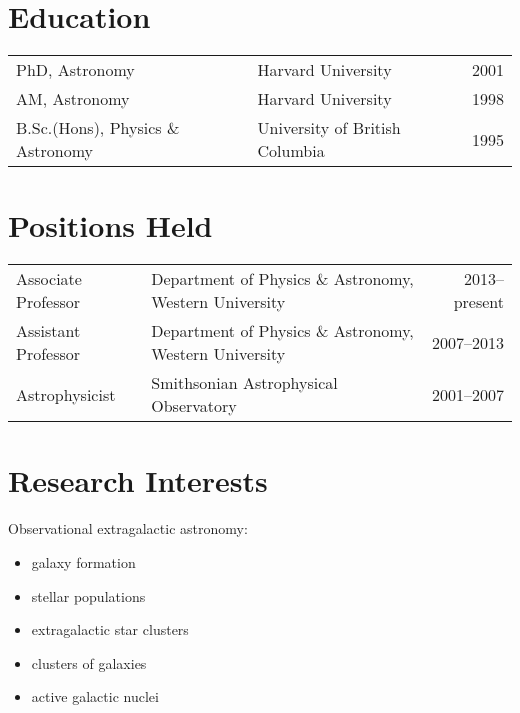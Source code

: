 \documentclass[12pt]{article}
\begin{document}
\maketitle

\section{Education}
\begin{tabularx}{\textwidth}{lXr}
PhD, Astronomy & Harvard University & 2001\\
AM, Astronomy & Harvard University & 1998\\
B.Sc.(Hons),  Physics \& Astronomy & University of British Columbia&1995\\
\end{tabularx}

\section{Positions Held} 

\begin{tabularx}{\textwidth}{lXr}
Associate Professor & Department of Physics \& Astronomy, Western University & 2013--present \\
Assistant Professor& Department of Physics \& Astronomy, Western University&2007--2013  \\
 Astrophysicist & Smithsonian Astrophysical Observatory & 2001--2007\\
\end{tabularx}


\section{Research Interests}

Observational extragalactic astronomy: 
\begin{itemize} 
\item galaxy formation
\item stellar populations
\item extragalactic star clusters
\item clusters of galaxies
\item active galactic nuclei
\end{itemize}
\end{document}
